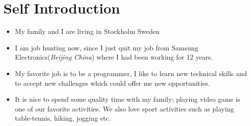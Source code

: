 \documentclass{article}
\begin{document}
\section{ Self Introduction}
\begin{itemize}
\item{My family and I are living in Stockholm Sweden}
\item{I am job hunting now, since I just quit my job from Samsung Electronics(\textit{Beijing China}) where I had been working for 12 years.}

\item{My favorite job is to be a programmer, I like to learn new technical skills and to accept new challenges which could offer me new opportunities.}

\item{It is nice to spend some quality time with my family; playing video game is one of our favorite activities. We also love sport activities such as playing table-tennis, hiking, jogging etc.}
\end{itemize}
\end{document}
